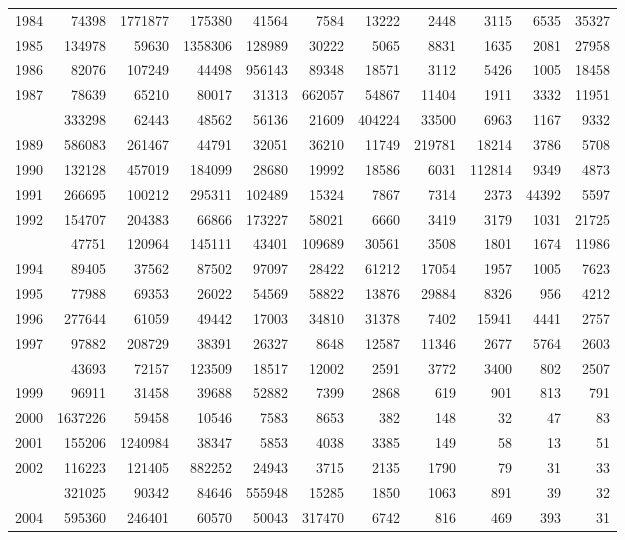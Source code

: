 \documentclass[
]{article}
\begin{document}
\begin{longtable}[t]{lrrrrrrrrrr}
1984 & 74398 & 1771877 & 175380 & 41564 & 7584 & 13222 & 2448 & 3115 & 6535 & 35327\\
1985 & 134978 & 59630 & 1358306 & 128989 & 30222 & 5065 & 8831 & 1635 & 2081 & 27958\\
1986 & 82076 & 107249 & 44498 & 956143 & 89348 & 18571 & 3112 & 5426 & 1005 & 18458\\
1987 & 78639 & 65210 & 80017 & 31313 & 662057 & 54867 & 11404 & 1911 & 3332 & 11951\\
\addlinespace
1988 & 333298 & 62443 & 48562 & 56136 & 21609 & 404224 & 33500 & 6963 & 1167 & 9332\\
1989 & 586083 & 261467 & 44791 & 32051 & 36210 & 11749 & 219781 & 18214 & 3786 & 5708\\
1990 & 132128 & 457019 & 184099 & 28680 & 19992 & 18586 & 6031 & 112814 & 9349 & 4873\\
1991 & 266695 & 100212 & 295311 & 102489 & 15324 & 7867 & 7314 & 2373 & 44392 & 5597\\
1992 & 154707 & 204383 & 66866 & 173227 & 58021 & 6660 & 3419 & 3179 & 1031 & 21725\\
\addlinespace
1993 & 47751 & 120964 & 145111 & 43401 & 109689 & 30561 & 3508 & 1801 & 1674 & 11986\\
1994 & 89405 & 37562 & 87502 & 97097 & 28422 & 61212 & 17054 & 1957 & 1005 & 7623\\
1995 & 77988 & 69353 & 26022 & 54569 & 58822 & 13876 & 29884 & 8326 & 956 & 4212\\
1996 & 277644 & 61059 & 49442 & 17003 & 34810 & 31378 & 7402 & 15941 & 4441 & 2757\\
1997 & 97882 & 208729 & 38391 & 26327 & 8648 & 12587 & 11346 & 2677 & 5764 & 2603\\
\addlinespace
1998 & 43693 & 72157 & 123509 & 18517 & 12002 & 2591 & 3772 & 3400 & 802 & 2507\\
1999 & 96911 & 31458 & 39688 & 52882 & 7399 & 2868 & 619 & 901 & 813 & 791\\
2000 & 1637226 & 59458 & 10546 & 7583 & 8653 & 382 & 148 & 32 & 47 & 83\\
2001 & 155206 & 1240984 & 38347 & 5853 & 4038 & 3385 & 149 & 58 & 13 & 51\\
2002 & 116223 & 121405 & 882252 & 24943 & 3715 & 2135 & 1790 & 79 & 31 & 33\\
\addlinespace
2003 & 321025 & 90342 & 84646 & 555948 & 15285 & 1850 & 1063 & 891 & 39 & 32\\
2004 & 595360 & 246401 & 60570 & 50043 & 317470 & 6742 & 816 & 469 & 393 & 31\\

\end{longtable}
\end{document}
